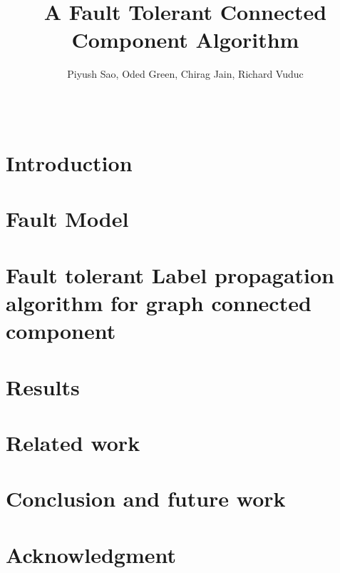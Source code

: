 \documentclass[english]{sig-alternate-05-2015}
\theoremstyle{plain}
\theoremstyle{definition}
\begin{document}

\title{A Fault Tolerant Connected Component Algorithm }

  \author{
  \alignauthor
    Piyush Sao, Oded Green, Chirag Jain, Richard Vuduc \\
      \\
      \\
  }


\maketitle





\section{Introduction}

\label{sec:intro}

\section{Fault Model}

\label{sec:fault}

\section{Fault tolerant Label propagation algorithm for graph connected component}

\label{sec:connected}

\section{Results}

\label{sec:results}

\section{Related work}

\label{sec:related}

\section{Conclusion and future work}

\label{sec:conclusion}

\section{Acknowledgment}



% 

\end{document}
